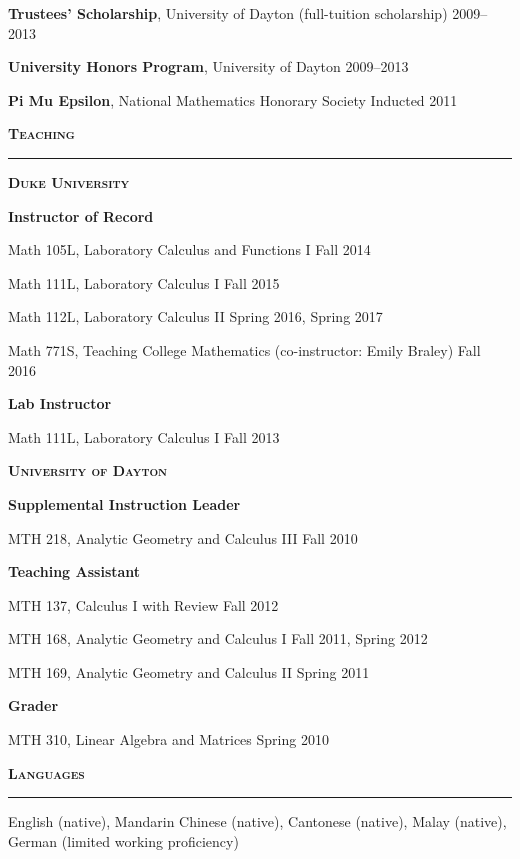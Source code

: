 \documentclass[10pt]{article}
\newcommand{\sect}[1]{
  \vspace{.75em}
  \textbf{\textsc{\Large #1}}

  \vspace{-1.5em}
  \noindent\rule{\textwidth}{.5pt}
  \vspace{-1.5em}
}
\begin{document}
\textbf{Trustees' Scholarship}, University of Dayton (full-tuition
scholarship) \hfill 2009--2013


\textbf{University Honors Program}, University of Dayton \hfill
2009--2013

\textbf{Pi Mu Epsilon}, National Mathematics Honorary Society \hfill
Inducted 2011\setlength{\parskip}{.75em}

\sect{Teaching}

\textbf{\textsc{\large Duke University}}

\setlength{\leftskip}{1em}

\vspace{-.25em}
\textbf{Instructor of Record}
\setlength{\parskip}{.25em}

Math 105L, Laboratory Calculus and Functions I \hfill Fall 2014

Math 111L, Laboratory Calculus I \hfill Fall 2015

Math 112L, Laboratory Calculus II \hfill Spring 2016, Spring 2017

Math 771S, Teaching College Mathematics (co-instructor: Emily Braley) \hfill
Fall 2016\setlength{\parskip}{.75em}

\textbf{Lab Instructor}
\setlength{\parskip}{.25em}

Math 111L, Laboratory Calculus I \hfill Fall 2013\setlength{\parskip}{.75em}

\setlength{\leftskip}{0em}

\vspace{.5em}
\textbf{\textsc{\large University of Dayton}}

\setlength{\leftskip}{1em}

\vspace{-.25em}
\textbf{Supplemental Instruction Leader}
\setlength{\parskip}{.25em}

MTH 218, Analytic Geometry and Calculus III \hfill Fall 2010\setlength{\parskip}{.75em}

\textbf{Teaching Assistant}
\setlength{\parskip}{.25em}

MTH 137, Calculus I with Review \hfill Fall 2012

MTH 168, Analytic Geometry and Calculus I \hfill Fall 2011, Spring 2012

MTH 169, Analytic Geometry and Calculus II \hfill Spring
2011\setlength{\parskip}{.75em}

\textbf{Grader}
\setlength{\parskip}{.25em}

MTH 310, Linear Algebra and Matrices \hfill Spring 2010\setlength{\parskip}{.75em}

\setlength{\leftskip}{0em}

\sect{Languages}

English (native), Mandarin Chinese (native), Cantonese (native), Malay (native),
German (limited working proficiency)
\end{document}
